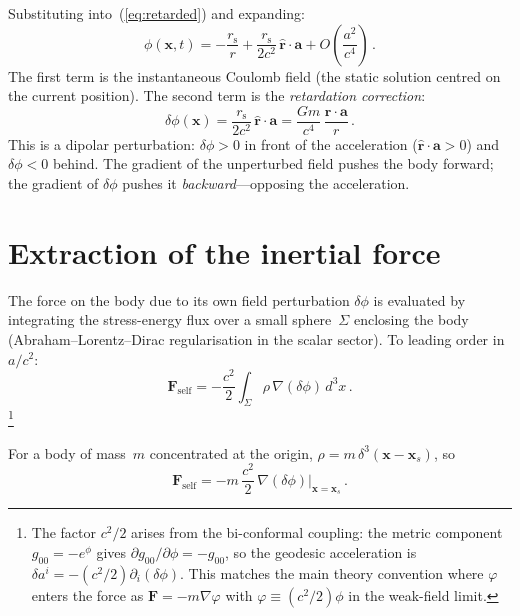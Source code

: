 \documentclass[11pt]{article}
\newcommand{\rs}{r_{\mathrm{s}}}
\begin{document}
Substituting into~(\ref{eq:retarded}) and expanding:
\begin{equation}\label{eq:phi_expand}
  \phi(\mathbf{x},t) = -\frac{\rs}{r}
  + \frac{\rs}{2c^2}\,\hat{\mathbf{r}}\cdot\mathbf{a}
  + O\!\left(\frac{a^2}{c^4}\right)\,.
\end{equation}
The first term is the instantaneous Coulomb field
(the static solution centred on the current position).
The second term is the \emph{retardation correction}:
\begin{equation}\label{eq:delta_phi}
  \boxed{\delta\phi(\mathbf{x})
  = \frac{\rs}{2c^2}\,\hat{\mathbf{r}}\cdot\mathbf{a}
  = \frac{Gm}{c^4}\,\frac{\mathbf{r}\cdot\mathbf{a}}{r}\,.}
\end{equation}
This is a dipolar perturbation: $\delta\phi > 0$ in front
of the acceleration ($\hat{\mathbf{r}}\cdot\mathbf{a} > 0$)
and $\delta\phi < 0$ behind.  The gradient of the
unperturbed field pushes the body forward; the gradient
of $\delta\phi$ pushes it \emph{backward}---opposing
the acceleration.

\section{Extraction of the inertial force}
\label{sec:inertial_force}

The force on the body due to its own field perturbation
$\delta\phi$ is evaluated by integrating the stress-energy
flux over a small sphere~$\Sigma$ enclosing the body
(Abraham--Lorentz--Dirac regularisation in the scalar
sector).  To leading order in $a/c^2$:
\begin{equation}\label{eq:self_force}
  \mathbf{F}_{\mathrm{self}} =
  -\frac{c^2}{2}\int_\Sigma \rho\,\nabla(\delta\phi)\,d^3x\,.
\end{equation}
\footnote{The factor $c^2/2$ arises from the bi-conformal
coupling: the metric component $g_{00}=-e^{\phi}$ gives
$\partial g_{00}/\partial\phi=-g_{00}$, so the geodesic
acceleration is $\delta a^i=-(c^2/2)\partial_i(\delta\phi)$.
This matches the main theory convention where $\varphi$
enters the force as $\mathbf{F}=-m\nabla\varphi$ with
$\varphi\equiv(c^2/2)\phi$ in the weak-field limit.}

For a body of mass~$m$ concentrated at the origin,
$\rho = m\,\delta^3(\mathbf{x} - \mathbf{x}_s)$, so
\begin{equation}\label{eq:F_self_eval}
  \mathbf{F}_{\mathrm{self}} =
  -m\,\frac{c^2}{2}\,\nabla(\delta\phi)\bigg|_{\mathbf{x}
  = \mathbf{x}_s}\,.
\end{equation}
\end{document}
